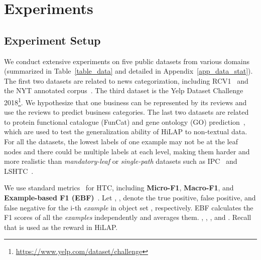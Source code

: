\documentclass[11pt,a4paper]{article}
\newcommand{\start}[1]{\vspace{1.8mm}\noindent{{\bf #1}}}
\begin{document}
\section{Experiments}




\subsection{Experiment Setup}
\start{Datasets.}
We conduct extensive experiments on five public datasets from various domains (summarized in Table~\ref{table_data} and detailed in Appendix~\ref{app_data_stat}).
The first two datasets are related to news categorization, including RCV1~\citep{lewis2004rcv1} and the NYT annotated corpus~\citep{sandhaus2008new}.
The third dataset is the Yelp Dataset Challenge 2018\footnote{\url{https://www.yelp.com/dataset/challenge}}.
We hypothesize that one business can be represented by its reviews and use the reviews to predict business categories.
The last two datasets are related to protein functional catalogue (FunCat) and gene ontology (GO) prediction~\cite{vens2008decision}, which are used to test the generalization ability of HiLAP to non-textual data.
For all the datasets, the lowest labels of one example may not be at the leaf nodes and there could be multiple labels at each level, making them harder and more realistic than \textit{mandatory-leaf} or \textit{single-path} datasets such as IPC~\cite{wipo2014international} and LSHTC~\cite{PartalasKBAPGAA15}.

\start{Evaluation Metrics.}
\label{subsec:metric}
We use standard metrics~\citep{johnson2014effective,Meng2018WeaklySupervisedNT,peng2018large} for HTC, including \textbf{Micro-F1}, \textbf{Macro-F1}, and \textbf{Example-based F1 (EBF)}~\cite{PartalasKBAPGAA15,peng2016deepmesh}.
Let , ,  denote the true positive, false positive, and false negative for the i-th \textit{example}  in object set , respectively.
EBF calculates the F1 scores of all the \textit{examples} independently and averages them.
, , , and . 
Recall that  is used as the reward in HiLAP.
\end{document}
